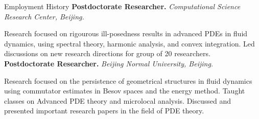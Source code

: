 \begin{rubric}{Employment History}
	\entry*[\mydaterange{2022}{2023}]%
	\textbf{Postdoctorate Researcher.} \emph{Computational Science Research Center, Beijing.}

	Research focused on rigourous ill-posedness results in advanced PDEs in fluid dynamics, using spectral theory, harmonic analysis, and convex integration. Led discussions on new research directions for group of 20 researchers.
%
	 \entry*[\mydaterange{2019}{2021}]%
	 \textbf{Postdoctorate Researcher.} \emph{Beijing Normal University, Beijing.} 

	Research focused on the persistence of geometrical structures in fluid dynamics using commutator estimates in Besov spaces and the energy method. Taught classes on Advanced PDE theory and microlocal analysis. Discussed and presented important research papers in the field of PDE theory.
\end{rubric}
